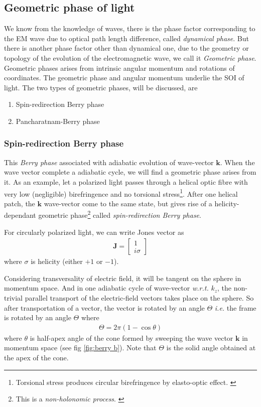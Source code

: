 \documentclass[11pt,a4paper]{article}
\numberwithin{equation}{section}
\begin{document}
\subsection{Geometric phase of light}
We know from the knowledge of waves, there is the phase factor corresponding to the EM wave due to optical path length difference, called \textit{dynamical phase}. But there is another phase factor other than dynamical one, due to the geometry or topology of the evolution of the electromagnetic wave, we call it \textit{Geometric phase}.\cite{WO} Geometric phases arises from intrinsic angular momentum and rotations of coordinates. The geometric phase and angular momentum underlie the SOI of light.\cite{bliokh 15} The two types of geometric phases, will be discussed, are
\begin{enumerate}
	\item Spin-redirection Berry phase
	\item Pancharatnam-Berry phase
\end{enumerate}

\subsubsection{Spin-redirection Berry phase}
This \textit{Berry phase} associated with adiabatic evolution of wave-vector $\boldsymbol{k}$. When the wave vector complete a adiabatic cycle, we will find a geometric phase arises from it.  As an example, let a polarized light passes through a helical optic fibre with very low (negligible) birefringence and no torsional stress\footnote{Torsional stress produces circular birefringence by elasto-optic effect. \cite{ross 84}}. After one helical patch, the $\boldsymbol{k}$ wave-vector come to the same state, but gives rise of a helicity-dependant geometric phase\footnote{This is a \textit{non-holonomic process}. \cite{anholonomy}} called \textit{spin-redirection Berry phase}. \cite{bliokh 15}

For circularly polarized light, we can write Jones vector as 
\begin{align}
	\boldsymbol{J} = 
	\begin{bmatrix}
		1\\i\sigma
	\end{bmatrix}
\end{align}
where  $\sigma$ is helicity (either $+1$ or $-1$).

Considering transversality of electric field, it will be tangent on the sphere in momentum space. And in one adiabatic cycle of wave-vector \textit{w.r.t.} $k_z$, the non-trivial parallel transport of the electric-field vectors takes place on the sphere.\cite{bliokh 15} So after transportation of a vector, the vector is rotated by an angle $\Theta$ \cite{par trans} \textit{i.e.} the frame is rotated by an angle $\Theta$ where
\begin{align}
	\Theta = 2\pi(1-\cos\theta)
\end{align} where $\theta$ is half-apex angle of the cone formed by sweeping the wave vector $\boldsymbol{k}$ in momentum space (see fig \ref{fig:berry b}). Note that $\Theta$ is the solid angle obtained at the apex of the cone.
\end{document}
